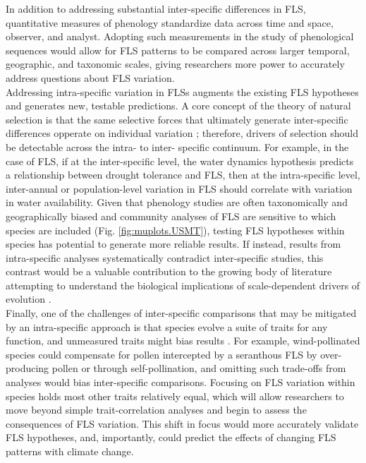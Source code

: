 \documentclass{article}
\begin{document}
\noindent In addition to addressing substantial inter-specific differences in FLS, quantitative measures of phenology \citep[e.g. the BBCH scale,][]{Finn2007} standardize data across time and space, observer, and analyst. Adopting such measurements in the study of phenological sequences would allow for FLS patterns to be compared across larger temporal, geographic, and taxonomic scales, giving researchers more power to accurately address questions about FLS variation.\\

\noindent Addressing intra-specific variation in FLSs augments the existing FLS hypotheses and generates new, testable predictions. A core concept of the theory of natural selection is that the same selective forces that ultimately generate inter-specific differences opperate on individual variation \citep{Dobzhansky1982, Schluter1996}; therefore, drivers of selection should be detectable across the intra- to inter- specific continuum. For example, in the case of FLS, if at the inter-specific level, the water dynamics hypothesis predicts a relationship between drought tolerance and FLS, then at the intra-specific level, inter-annual or population-level variation in FLS should correlate with variation in water availability. Given that phenology studies are often taxonomically and geographically biased \citep{Wolkovich2014,Willis2017} and community analyses of FLS are sensitive to which species are included (Fig. \ref{fig:muplots.USMT}), testing FLS hypotheses within species has potential to generate more reliable results. If instead, results from intra-specific analyses systematically contradict inter-specific studies, this contrast would be a valuable contribution to the growing body of literature attempting to understand the biological implications of scale-dependent drivers of evolution \citep[e.g.,][]{Violle2012,Shipley2016,Anderegg2018}.  \\ %
 
\noindent Finally, one of the challenges of inter-specific comparisons that may be mitigated by an intra-specific approach is that species evolve a suite of traits for any function, and unmeasured traits might bias results \citep{Davies2019}. For example, wind-pollinated species could compensate for pollen intercepted by a seranthous FLS by over-producing pollen or through self-pollination, and omitting such trade-offs from analyses would bias inter-specific comparisons. Focusing on FLS variation within species holds most other traits relatively equal, which will allow researchers to move beyond simple trait-correlation analyses and begin to assess the consequences of FLS variation. This shift in focus would more accurately validate FLS hypotheses, and, importantly, could predict the effects of changing FLS patterns with climate change. \\
\end{document}

